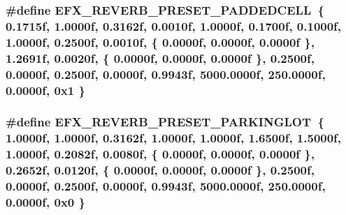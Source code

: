 \subsubsection[{\texorpdfstring{E\+F\+X\+\_\+\+R\+E\+V\+E\+R\+B\+\_\+\+P\+R\+E\+S\+E\+T\+\_\+\+P\+A\+D\+D\+E\+D\+C\+E\+LL}{EFX_REVERB_PRESET_PADDEDCELL}}]{\setlength{\rightskip}{0pt plus 5cm}\#define E\+F\+X\+\_\+\+R\+E\+V\+E\+R\+B\+\_\+\+P\+R\+E\+S\+E\+T\+\_\+\+P\+A\+D\+D\+E\+D\+C\+E\+LL~\{ 0.\+1715f, 1.\+0000f, 0.\+3162f, 0.\+0010f, 1.\+0000f, 0.\+1700f, 0.\+1000f, 1.\+0000f, 0.\+2500f, 0.\+0010f, \{ 0.\+0000f, 0.\+0000f, 0.\+0000f \}, 1.\+2691f, 0.\+0020f, \{ 0.\+0000f, 0.\+0000f, 0.\+0000f \}, 0.\+2500f, 0.\+0000f, 0.\+2500f, 0.\+0000f, 0.\+9943f, 5000.\+0000f, 250.\+0000f, 0.\+0000f, 0x1 \}}\hypertarget{efx-presets_8h_a74f770d92d0a66fe01e1cb2691db14b5}{}\label{efx-presets_8h_a74f770d92d0a66fe01e1cb2691db14b5}
\subsubsection[{\texorpdfstring{E\+F\+X\+\_\+\+R\+E\+V\+E\+R\+B\+\_\+\+P\+R\+E\+S\+E\+T\+\_\+\+P\+A\+R\+K\+I\+N\+G\+L\+OT}{EFX_REVERB_PRESET_PARKINGLOT}}]{\setlength{\rightskip}{0pt plus 5cm}\#define E\+F\+X\+\_\+\+R\+E\+V\+E\+R\+B\+\_\+\+P\+R\+E\+S\+E\+T\+\_\+\+P\+A\+R\+K\+I\+N\+G\+L\+OT~\{ 1.\+0000f, 1.\+0000f, 0.\+3162f, 1.\+0000f, 1.\+0000f, 1.\+6500f, 1.\+5000f, 1.\+0000f, 0.\+2082f, 0.\+0080f, \{ 0.\+0000f, 0.\+0000f, 0.\+0000f \}, 0.\+2652f, 0.\+0120f, \{ 0.\+0000f, 0.\+0000f, 0.\+0000f \}, 0.\+2500f, 0.\+0000f, 0.\+2500f, 0.\+0000f, 0.\+9943f, 5000.\+0000f, 250.\+0000f, 0.\+0000f, 0x0 \}}\hypertarget{efx-presets_8h_a92af074540f1cef1a1831574abd23511}{}\label{efx-presets_8h_a92af074540f1cef1a1831574abd23511}
